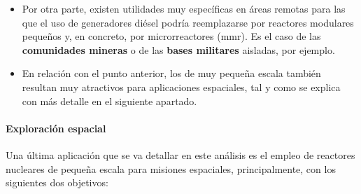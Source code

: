 \begin{itemize}
  \item Por otra parte, existen utilidades muy específicas en áreas remotas para las que el uso de generadores diésel podría reemplazarse por reactores modulares pequeños y, en concreto, por microrreactores (\acrshort{mmr}). Es el caso de las \textbf{comunidades mineras} o de las \textbf{bases militares} aisladas, por ejemplo.
  
  \item En relación con el punto anterior, los  de muy pequeña escala también resultan muy atractivos para aplicaciones espaciales, tal y como se explica con más detalle en el siguiente apartado. 
\end{itemize}

\paragraph{Exploración espacial} \label{exploracion_espacial}

Una última aplicación que se va detallar en este análisis es el empleo de reactores nucleares de pequeña escala para misiones espaciales, principalmente, con los siguientes dos objetivos:

